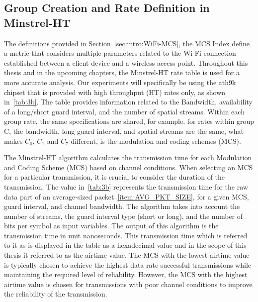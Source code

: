 \subsection{Group Creation and Rate Definition in Minstrel-HT}
\label{sec:intro:wifiratecontrol:Group creation}

The definitions provided in Section~\ref{sec:intro:WiFi-MCS}, the MCS Index define a metric that considers multiple parameters related to the Wi-Fi connection established between a client device and a wireless access point. Throughout this thesis and in the upcoming chapters, the Minstrel-HT rate table is used for a more accurate analysis. Our experiments will specifically be using the ath9k chipset that is provided with high throughput (HT) rates only, as shown in~\ref{tab:3b}. The table provides information related to the Bandwidth, availability of a long/short guard interval, and the number of spatial streams. Within each group rate, the same specifications are shared, for example, for rates within group C, the bandwidth, long guard interval, and spatial streams are the same, what makes $C_{0}$, $C_{1}$ and $C_{7}$ different, is the modulation and coding schemes (MCS).

The Minstrel-HT algorithm calculates the transmission time for each Modulation and Coding Scheme (MCS) based on channel conditions. When selecting an MCS for a particular transmission, it is crucial to consider the duration of the transmission. The value in~\ref{tab:3b} represents the transmission time for the raw data part of an average-sized packet~\ref{item:AVG_PKT_SIZE}, for a given MCS, guard interval, and channel bandwidth. The algorithm takes into account the number of streams, the guard interval type (short or long), and the number of bits per symbol as input variables. The output of this algorithm is the transmission time in unit nanoseconds. This transmission time which is referred to it as is displayed in the table as a hexadecimal value and in the scope of this thesis it referred to as the airtime value. The MCS with the lowest airtime value is typically chosen to achieve the highest data rate successful transmissions while maintaining the required level of reliability. However, the MCS with the highest airtime value is chosen for transmissions with poor channel conditions to improve the reliability of the transmission.


